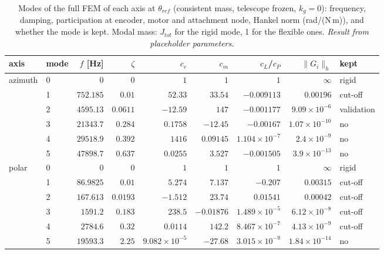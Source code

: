 \documentclass[10pt,a4paper]{article}
\numberwithin{equation}{section}
\begin{document}
\begin{table}[H]\centering\small
\caption{Modes of the full FEM of each axis at $\theta_{ref}$ (consistent mass, telescope frozen, $k_g = 0$): frequency, damping, participation at encoder, motor and attachment node, Hankel norm (rad/(N\,m)), and whether the mode is kept. Modal mass: $J_{tot}$ for the rigid mode, 1 for the flexible ones. \emph{Result from placeholder parameters.}}\label{tab:modal_modes}
\begin{tabular}{llrrrrrrl}\toprule
axis & mode & $f$ [Hz] & $\zeta$ & $c_e$ & $c_m$ & $c_{L}$/$c_P$ & $\|G_i\|_h$ & kept \\ \midrule
azimuth & 0 & $0$ & $0$ & $1$ & $1$ & $1$ & $\infty$ & rigid \\
 & 1 & $752.185$ & $0.01$ & $52.33$ & $33.54$ & $-0.009113$ & $0.00196$ & cut-off \\
 & 2 & $4595.13$ & $0.0611$ & $-12.59$ & $147$ & $-0.001177$ & $9.09\times10^{-6}$ & validation \\
 & 3 & $21343.7$ & $0.284$ & $0.1758$ & $-12.45$ & $-0.00167$ & $1.07\times10^{-10}$ & no \\
 & 4 & $29518.9$ & $0.392$ & $1416$ & $0.09145$ & $1.104\times10^{-7}$ & $2.4\times10^{-9}$ & no \\
 & 5 & $47898.7$ & $0.637$ & $0.0255$ & $3.527$ & $-0.001505$ & $3.9\times10^{-13}$ & no \\
\midrule
polar & 0 & $0$ & $0$ & $1$ & $1$ & $1$ & $\infty$ & rigid \\
 & 1 & $86.9825$ & $0.01$ & $5.274$ & $7.137$ & $-0.207$ & $0.00315$ & cut-off \\
 & 2 & $167.613$ & $0.0193$ & $-1.512$ & $23.74$ & $0.01541$ & $0.00042$ & cut-off \\
 & 3 & $1591.2$ & $0.183$ & $238.5$ & $-0.01876$ & $1.489\times10^{-5}$ & $6.12\times10^{-8}$ & cut-off \\
 & 4 & $2784.6$ & $0.32$ & $0.0114$ & $142.2$ & $8.467\times10^{-7}$ & $4.13\times10^{-9}$ & cut-off \\
 & 5 & $19593.3$ & $2.25$ & $9.082\times10^{-5}$ & $-27.68$ & $3.015\times10^{-9}$ & $1.84\times10^{-14}$ & no \\

\bottomrule\end{tabular}\end{table}
\end{document}
